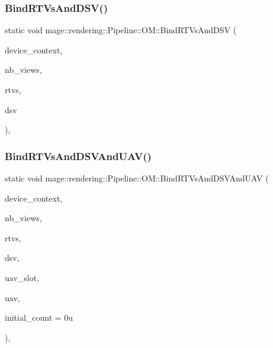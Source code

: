 \subsubsection{\texorpdfstring{Bind\+R\+T\+Vs\+And\+D\+S\+V()}{BindRTVsAndDSV()}}
{\footnotesize\ttfamily static void mage\+::rendering\+::\+Pipeline\+::\+O\+M\+::\+Bind\+R\+T\+Vs\+And\+D\+SV (\begin{DoxyParamCaption}\item[{I\+D3\+D11\+Device\+Context \&}]{device\+\_\+context,  }\item[{\mbox{\hyperlink{namespacemage_a41c104c036fba3756a74e19f793eeaa1}{U32}}}]{nb\+\_\+views,  }\item[{I\+D3\+D11\+Render\+Target\+View $\ast$const $\ast$}]{rtvs,  }\item[{I\+D3\+D11\+Depth\+Stencil\+View $\ast$}]{dsv }\end{DoxyParamCaption})\hspace{0.3cm}{\ttfamily [static]}, {\ttfamily [noexcept]}}

\mbox{\label{structmage_1_1rendering_1_1_pipeline_1_1_o_m_ad1f9cf7c290cb8f2135a21f5d4f25473}} 
\subsubsection{\texorpdfstring{Bind\+R\+T\+Vs\+And\+D\+S\+V\+And\+U\+A\+V()}{BindRTVsAndDSVAndUAV()}}
{\footnotesize\ttfamily static void mage\+::rendering\+::\+Pipeline\+::\+O\+M\+::\+Bind\+R\+T\+Vs\+And\+D\+S\+V\+And\+U\+AV (\begin{DoxyParamCaption}\item[{I\+D3\+D11\+Device\+Context \&}]{device\+\_\+context,  }\item[{\mbox{\hyperlink{namespacemage_a41c104c036fba3756a74e19f793eeaa1}{U32}}}]{nb\+\_\+views,  }\item[{I\+D3\+D11\+Render\+Target\+View $\ast$const $\ast$}]{rtvs,  }\item[{I\+D3\+D11\+Depth\+Stencil\+View $\ast$}]{dsv,  }\item[{\mbox{\hyperlink{namespacemage_a41c104c036fba3756a74e19f793eeaa1}{U32}}}]{uav\+\_\+slot,  }\item[{I\+D3\+D11\+Unordered\+Access\+View $\ast$}]{uav,  }\item[{\mbox{\hyperlink{namespacemage_a41c104c036fba3756a74e19f793eeaa1}{U32}}}]{initial\+\_\+count = {\ttfamily 0u} }\end{DoxyParamCaption})\hspace{0.3cm}{\ttfamily [static]}, {\ttfamily [noexcept]}}

